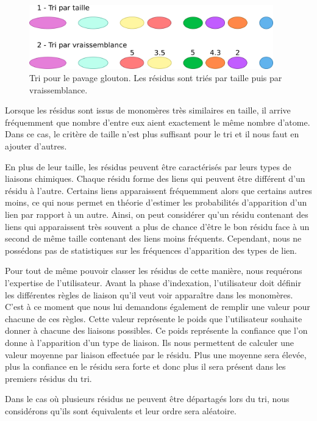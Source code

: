 \begin{figure}
  \begin{center}
    \includegraphics[width=400px]{Figures/s2m/pavage/tri.png}
    \caption{\label{tri_glouton}Tri pour le pavage glouton.
    Les résidus sont triés par taille puis par vraissemblance.}
  \end{center}
\end{figure}

Lorsque les résidus sont issus de monomères très similaires en taille, il arrive fréquemment que nombre d'entre eux
aient exactement le même nombre d'atome.
Dans ce cas, le critère de taille n'est plus suffisant pour le tri et il nous faut en ajouter d'autres.

En plus de leur taille, les résidus peuvent être caractérisés par leurs types de liaisons chimiques.
Chaque résidu forme des liens qui peuvent être différent d'un résidu à l'autre.
Certains liens apparaissent fréquemment alors que certains autres moins, ce qui nous permet en théorie d'estimer les
probabilités d'apparition d'un lien par rapport à un autre.
Ainsi, on peut considérer qu'un résidu contenant des liens qui apparaissent très souvent a plus de chance d'être le bon résidu
face à un second de même taille contenant des liens moins fréquents.
Cependant, nous ne possédons pas de statistiques sur les fréquences d'apparition des types de lien.

Pour tout de même pouvoir classer les résidus de cette manière, nous requérons l'expertise de l'utilisateur.
Avant la phase d'indexation, l'utilisateur doit définir les différentes règles de liaison qu'il veut voir apparaître dans les monomères.
C'est à ce moment que nous lui demandons également de remplir une valeur pour chacune de ces règles.
Cette valeur représente le poids que l'utilisateur souhaite donner à chacune des liaisons possibles.
Ce poids représente la confiance que l'on donne à l'apparition d'un type de liaison.
Ils nous permettent de calculer une valeur moyenne par liaison effectuée par le résidu.
Plus une moyenne sera élevée, plus la confiance en le résidu sera forte et donc plus il sera présent dans les premiers résidus du tri.

Dans le cas où plusieurs résidus ne peuvent être départagés lors du tri, nous considérons qu'ils sont équivalents et leur ordre sera aléatoire.


